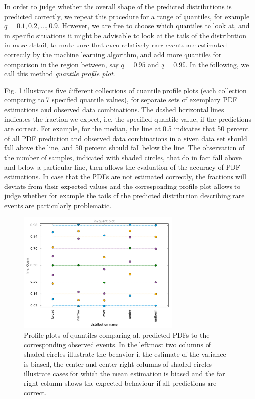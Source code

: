 \documentclass[BCOR=1mm, DIV=calc,10pt,
twoside=true,
twocolumn,
headings=normal]{scrartcl}
\newcommand{\fig}{Fig. }
\begin{document}
In order to judge whether the overall shape of the predicted distributions is predicted correctly, we repeat this procedure for a range of quantiles, for example $q = 0.1, 0.2, \ldots, 0.9$. However, we are free to choose which quantiles to look at, and in specific situations it might be advisable to look at the tails of the distribution in more detail, to make sure that even relatively rare events are estimated correctly by the machine learning algorithm, and add more quantiles for comparison in the region between, say $q = 0.95$ and $q = 0.99$. In the following, we call this method {\em quantile profile plot}.

\fig \ref{fig:quant_profiles} illustrates five different collections of quantile profile plots (each collection comparing to 7 specified quantile values), for separate sets of exemplary PDF estimations and observed data combinations. The dashed horizontal lines indicates the fraction we expect, i.e. the specified quantile value, if the predictions are correct. For example, for the median, the line at 0.5 indicates that  50 percent of all PDF prediction and observed data combinations in a given data set should fall above the line, and 50 percent should fall below the line. The observation of the number of samples, indicated with shaded circles, that do in fact fall above and below a particular line, then allows the evaluation of the accuracy of PDF estimations. In case that the PDFs are not estimated correctly, the fractions will deviate from their expected values and the corresponding profile plot allows to judge whether for example the tails of the predicted distribution describing rare events are particularly problematic.

\begin{figure}
\begin{center}
\includegraphics[width=8cm]{../figures/invquant_profiles}
\caption{\label{fig:quant_profiles} Profile plots of quantiles comparing all predicted PDFs to the corresponding observed events. In the leftmost two columns of shaded circles illustrate the behavior if the estimate of the variance is biased, the center and center-right columns of shaded circles illustrate cases for which the mean estimation is biased and the far right column shows the expected behaviour if all predictions are correct.}
\end{center}
\end{figure}
\end{document}
